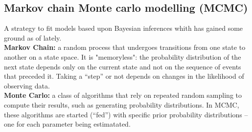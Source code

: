 \documentclass{article}
\begin{document}
\subsection{Markov chain Monte carlo modelling (MCMC)}
A strategy to fit models based upon Bayesian inferences whith has gained some ground as of lately.\\
\textbf{Markov Chain:} a random process that undergoes transitions from one state to another on a state space. It is "memoryless": the probability distribution of the next state depends only on the current state and not on the sequence of events that preceded it. Taking a “step” or not depends on changes in the likelihood of observing data.\\
\textbf{Monte Carlo:} a class of algorithms that rely on repeated random sampling to compute their results, such as generating probability distributions. In MCMC, these algorithms are started (“fed”) with specific prior probability distributions – one for each parameter being estimatated.\\
\end{document}
